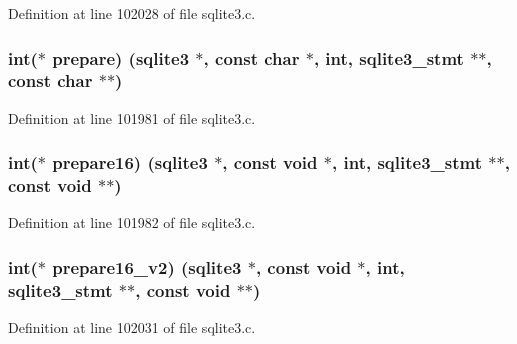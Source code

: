 Definition at line 102028 of file sqlite3.\+c.

\hypertarget{structsqlite3__api__routines_ae8b041015a252c244ca9fbfdbe0c23aa}{}
\subsubsection[{prepare}]{\setlength{\rightskip}{0pt plus 5cm}int($\ast$ prepare) ({\bf sqlite3} $\ast$, const char $\ast$, int, {\bf sqlite3\+\_\+stmt} $\ast$$\ast$, const char $\ast$$\ast$)}\label{structsqlite3__api__routines_ae8b041015a252c244ca9fbfdbe0c23aa}


Definition at line 101981 of file sqlite3.\+c.

\hypertarget{structsqlite3__api__routines_ac467657df3c662c8a5864889c2f8735f}{}
\subsubsection[{prepare16}]{\setlength{\rightskip}{0pt plus 5cm}int($\ast$ prepare16) ({\bf sqlite3} $\ast$, const void $\ast$, int, {\bf sqlite3\+\_\+stmt} $\ast$$\ast$, const void $\ast$$\ast$)}\label{structsqlite3__api__routines_ac467657df3c662c8a5864889c2f8735f}


Definition at line 101982 of file sqlite3.\+c.

\hypertarget{structsqlite3__api__routines_a31bf3acae352ca43abbb39b138fe2c44}{}
\subsubsection[{prepare16\+\_\+v2}]{\setlength{\rightskip}{0pt plus 5cm}int($\ast$ prepare16\+\_\+v2) ({\bf sqlite3} $\ast$, const void $\ast$, int, {\bf sqlite3\+\_\+stmt} $\ast$$\ast$, const void $\ast$$\ast$)}\label{structsqlite3__api__routines_a31bf3acae352ca43abbb39b138fe2c44}


Definition at line 102031 of file sqlite3.\+c.

\hypertarget{structsqlite3__api__routines_aa1832f166f601aa57ead3191e60f4046}{}
